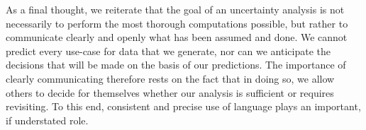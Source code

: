 As a final thought, we reiterate that the goal of an uncertainty analysis is not necessarily to perform the most thorough computations possible, but rather to communicate clearly and openly what has been assumed and done.  We cannot predict every use-case for data that we generate, nor can we anticipate the decisions that will be made on the basis of our predictions.  The importance of clearly communicating therefore rests on the fact that in doing so, we allow others to decide for themselves whether our analysis is sufficient or requires revisiting.  To this end, consistent and precise use of language plays an important, if understated role.






